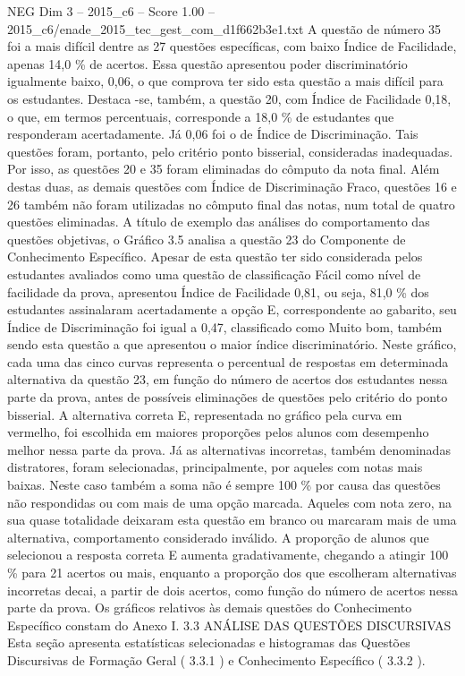 \begin{textsample}{NEG Dim 3 – 2015\_c6 – Score 1.00 – 2015\_c6/enade\_2015\_tec\_gest\_com\_d1f662b3e1.txt}
A questão de número 35 foi a mais difícil dentre as 27 questões específicas, com baixo Índice de Facilidade, apenas 14,0 \% de acertos.
Essa questão apresentou poder discriminatório igualmente baixo, 0,06, o que comprova ter sido esta questão a mais difícil para os estudantes.
Destaca -se, também, a questão 20, com Índice de Facilidade 0,18, o que, em termos percentuais, corresponde a 18,0 \% de estudantes que responderam acertadamente.
Já 0,06 foi o de Índice de Discriminação.
Tais questões foram, portanto, pelo critério ponto bisserial, consideradas inadequadas.
Por isso, as questões 20 e 35 foram eliminadas do cômputo da nota final.
Além destas duas, as demais questões com Índice de Discriminação Fraco, questões 16 e 26 também não foram utilizadas no cômputo final das notas, num total de quatro questões eliminadas.
A título de exemplo das análises do comportamento das questões objetivas, o Gráfico 3.5 analisa a questão 23 do Componente de Conhecimento Específico.
Apesar de esta questão ter sido considerada pelos estudantes avaliados como uma questão de classificação Fácil como nível de facilidade da prova, apresentou Índice de Facilidade 0,81, ou seja, 81,0 \% dos estudantes assinalaram acertadamente a opção E, correspondente ao gabarito, seu Índice de Discriminação foi igual a 0,47, classificado como Muito bom, também sendo esta questão a que apresentou o maior índice discriminatório.
Neste gráfico, cada uma das cinco curvas representa o percentual de respostas em determinada alternativa da questão 23, em função do número de acertos dos estudantes nessa parte da prova, antes de possíveis eliminações de questões pelo critério do ponto bisserial.
A alternativa correta E, representada no gráfico pela curva em vermelho, foi escolhida em maiores proporções pelos alunos com desempenho melhor nessa parte da prova.
Já as alternativas incorretas, também denominadas distratores, foram selecionadas, principalmente, por aqueles com notas mais baixas.
Neste caso também a soma não é sempre 100 \% por causa das questões não respondidas ou com mais de uma opção marcada.
Aqueles com nota zero, na sua quase totalidade deixaram esta questão em branco ou marcaram mais de uma alternativa, comportamento considerado inválido.
A proporção de alunos que selecionou a resposta correta E aumenta gradativamente, chegando a atingir 100 \% para 21 acertos ou mais, enquanto a proporção dos que escolheram alternativas incorretas decai, a partir de dois acertos, como função do número de acertos nessa parte da prova.
Os gráficos relativos às demais questões do Conhecimento Específico constam do Anexo I. 3.3 ANÁLISE DAS QUESTÕES DISCURSIVAS Esta seção apresenta estatísticas selecionadas e histogramas das Questões Discursivas de Formação Geral ( 3.3.1 ) e Conhecimento Específico ( 3.3.2 ).

\end{textsample}
